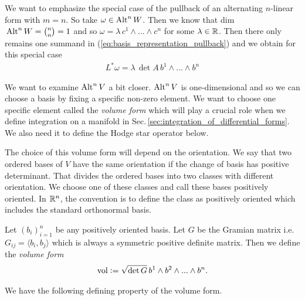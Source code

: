 \documentclass[../main.tex]{subfiles}
\begin{document}
We want to emphasize the special case of the pullback of an alternating $n$-linear form 
with $m = n$. So take $\omega \in {\text{Alt}^{n}\,W}$. Then we know that 
dim$\,{\text{Alt}^{n}\,W} = {n\choose n} = 1$ and so
$\omega = \lambda\, c^1 \wedge ... \wedge c^n$ for some $\lambda \in \mathbb{R}$. 
Then there only remains one summand in (\ref{eq:basis_representation_pullback}) 
and we obtain for this special case
\begin{align}
    L^* \omega = \lambda \, \det A \, b^1 \wedge ... \wedge b^n
    \label{eq:pullback_alternating_nlinear_map}
\end{align}

We want to examine ${\text{Alt}^{n}\,V}$ a bit closer. 
${\text{Alt}^{n}\,V}$ is one-dimensional and so we can choose a basis by fixing 
a specific non-zero element. We want to choose one specific element 
called the \textit{volume form} which will play a crucial role 
when we define integration on a manifold in Sec.\,\ref{sec:integration_of_differential_forms}. 
We also need it to 
define the Hodge star operator below.

The choice of this volume form will depend on the orientation. 
We say that two ordered bases of $V$ 
have the same orientation if the change of basis has positive determinant. 
That divides the ordered bases into two classes with different orientation.
We choose one of these classes and call these bases positively
oriented. In $\mathbb{R}^n$, the convention is to define the class as 
positively oriented which includes the standard orthonormal basis.

\begin{definition}
    Let $(b_i )_{i=1}^n$ be any positively oriented
    basis. Let $G$ be the Gramian matrix i.e. $G_{ij} = \langle b_i, b_j \rangle$ 
    which is always a symmetric positive definite matrix.
    Then we define the \textit{volume form}
    \begin{align*}
        \operatorname{vol} \vcentcolon= \sqrt{\det G} \, b^1 \wedge b^2 \wedge ... \wedge b^n.
    \end{align*}
\end{definition}

We have the following defining property of the volume form.
\end{document}
